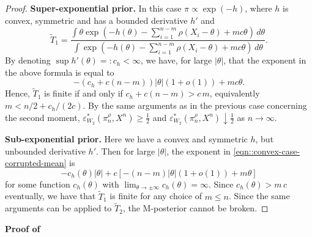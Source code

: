 \documentclass[11pt, oneside]{amsart}
\theoremstyle{definition}   %
\begin{document}
\begin{proof}
    \textbf{Super-exponential prior.} In this case \(\pi\propto \exp(-h) \), where \( h \) is convex, symmetric and has a bounded derivative \( h'\) and
    \begin{equation}
    \label{eqn::convex-case-corrupted-mean}
        \widetilde T_1 = \frac{\int \theta \exp \left (-h(\theta) -\sum_{i=1}^{n-m} \rho(X_i - \theta) + mc\theta \right) \, d\theta}{\int  \exp \left (- h(\theta) -\sum_{i=1}^{n-m} \rho(X_i - \theta) + mc\theta\right) \, d\theta}.
    \end{equation}
    By denoting \( \sup h'(\theta) =:  c_h  < \infty\), we have, for large \( | \theta |\), that the exponent in the above formula is equal to 
    \[ - (c_h + c(n-m) ) |\theta| (1 +o(1)) + m c \theta . \]
    Hence, \( \widetilde T_1\) is finite if and only if \( c_h + c( n-m ) >c \, m \), equivalently \( m < n/2 + c_h/(2c) \). By the same arguments as in the previous case concerning the second moment, %
   \( \varepsilon^*_{W_2}(\pi^{\rho}_n, X^n) \ge \frac{1}{2}\) and \( \varepsilon^*_{W_2}(\pi^{\rho}_n, X^n) \downarrow \frac{1}{2} \) as \( n \rightarrow \infty \).

    \textbf{Sub-exponential prior.} Here we have  a convex and symmetric \( h\), but unbounded derivative \( h'\). Then for large \( | \theta | \), the exponent in \eqref{eqn::convex-case-corrupted-mean} is
    \[ -c_h(\theta) | \theta | + c \left [ - (n-m)|\theta| (1 + o(1)) + m\theta \right ]   \]
    for some function \( c_h(\theta)\) with \( \lim_{\theta \rightarrow \pm \infty} c_h(\theta) = \infty\). Since \( c_h(\theta) > m \, c\) eventually, we have that \( \widetilde T_1\) is finite for any choice of \( m \leq n\). Since the same arguments can be applied to \( \widetilde T_2 \), the M-posterior cannot be broken.
\end{proof}
%
%
%
\noindent \textbf{Proof of }
\end{document}
